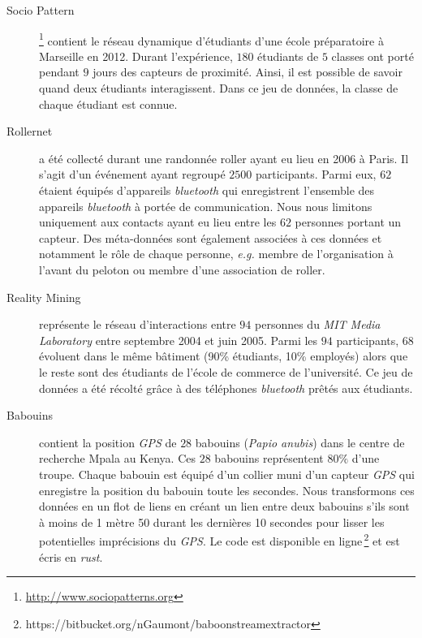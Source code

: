 \begin{description}
\item[Socio Pattern~\cite{Fournet2014}]\footnote{\url{http://www.sociopatterns.org}} contient le réseau dynamique d'étudiants d'une école préparatoire à Marseille en 2012. Durant l'expérience, $180$ étudiants de $5$ classes ont porté pendant $9$ jours des capteurs de proximité.
Ainsi, il est possible de savoir quand deux étudiants interagissent. 
Dans ce jeu de données, la classe de chaque étudiant est connue.\\

\item[Rollernet~\cite{Tournoux2009}] a été collecté durant une randonnée roller ayant eu lieu en 2006 à Paris.
Il s'agit d'un événement ayant regroupé $2500$ participants.
Parmi eux, $62$ étaient équipés d'appareils \emph{bluetooth} qui enregistrent l'ensemble des appareils \emph{bluetooth} à portée de communication.
Nous nous limitons uniquement aux contacts ayant eu lieu entre les $62$ personnes portant un capteur.
Des méta-données sont également associées à ces données et notamment le rôle de chaque personne, \emph{e.g.} membre de l'organisation à l'avant du peloton ou membre d'une association de roller.\\

\item[Reality Mining~\cite{Eagle2009}] représente le réseau d'interactions entre $94$ personnes du \emph{MIT Media Laboratory} entre septembre 2004 et juin 2005.
Parmi les $94$ participants, $68$ évoluent dans le même bâtiment (90\% étudiants, 10\% employés) alors que le reste sont des étudiants de l'école de commerce de l'université.
Ce jeu de données a été récolté grâce à des téléphones \emph{bluetooth} prêtés aux étudiants.\\

\item[Babouins~\cite{Crofoot2015,Strandburg-Peshkin2015}] contient la position \emph{GPS} de $28$ babouins (\emph{Papio anubis}) dans le centre de recherche Mpala au Kenya.
Ces $28$ babouins représentent $80\%$ d'une troupe.
Chaque babouin est équipé d'un collier muni d'un capteur \emph{GPS} qui enregistre la position du babouin toute les secondes.
Nous transformons ces données en un flot de liens en créant un lien entre deux babouins s'ils sont à moins de 1 mètre 50 durant les dernières 10 secondes pour lisser les potentielles imprécisions du \emph{GPS}.
Le code est disponible en ligne\,\footnote{https://bitbucket.org/nGaumont/baboonstreamextractor} et est écris en \emph{rust}.
\end{description}

